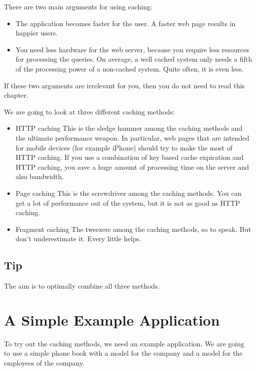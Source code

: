 \documentclass[a4paper]{book}
\begin{document}
There are two main arguments for using caching:

\begin{itemize}
\itemsep1pt\parskip0pt
\item
  The application becomes faster for the user. A faster web page results in happier users.
\item
  You need less hardware for the web server, because you require less resources for processing the queries. On average, a well cached system only needs a fifth of the processing power of a non-cached system. Quite often, it is even less.
\end{itemize}

If these two arguments are irrelevant for you, then you do not need to read this chapter.

We are going to look at three different caching methods:

\begin{itemize}
\itemsep1pt\parskip0pt
\item
  HTTP caching This is the sledge hammer among the caching methods and the ultimate performance weapon. In particular, web pages that are intended for mobile devices (for example iPhone) should try to make the most of HTTP caching. If you use a combination of key based cache expiration and HTTP caching, you save a huge amount of processing time on the server and also bandwidth.
\item
  Page caching This is the screwdriver among the caching methods. You can get a lot of performance out of the system, but it is not as good as HTTP caching.
\item
  Fragment caching The tweezers among the caching methods, so to speak. But don't underestimate it. Every little helps.
\end{itemize}

\subsection{Tip}\label{tip-19}

The aim is to optimally combine all three methods.

\section{A Simple Example Application}\label{a-simple-example-application}

To try out the caching methods, we need an example application. We are going to use a simple phone book with a model for the company and a model for the employees of the company.
\end{document}
